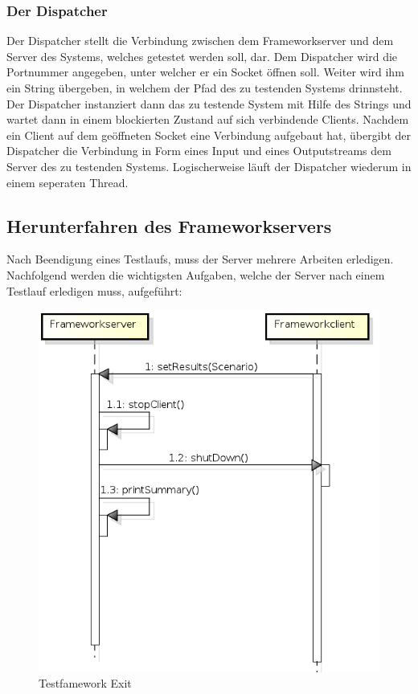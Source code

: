 \subsubsection{Der Dispatcher}
\label{sec:dispatcher}

Der Dispatcher stellt die Verbindung zwischen dem Frameworkserver und dem Server des Systems, welches getestet werden soll, dar. Dem Dispatcher wird die Portnummer angegeben, unter welcher er ein Socket öffnen soll. Weiter wird ihm ein String übergeben, in welchem der Pfad des zu testenden Systems drinnsteht. Der Dispatcher instanziert dann das zu testende System mit Hilfe des Strings und wartet dann in einem blockierten Zustand auf sich verbindende Clients. Nachdem ein Client auf dem geöffneten Socket eine Verbindung aufgebaut hat, übergibt der Dispatcher die Verbindung in Form eines Input und eines Outputstreams dem Server des zu testenden Systems.\newline
Logischerweise läuft der Dispatcher wiederum in einem seperaten Thread.

\subsection{Herunterfahren des Frameworkservers}
\label{sec:herunterfahrenFramework}

Nach Beendigung eines Testlaufs, muss der Server mehrere Arbeiten erledigen. Nachfolgend werden die wichtigsten Aufgaben, welche der Server nach einem Testlauf erledigen muss, aufgeführt:


\begin{figure}[H]
\begin{center}
\includegraphics[scale=0.2]{image_testFramework/BeendeTestlauf.png}
\end{center}
\caption{Testfamework Exit}
\end{figure}

